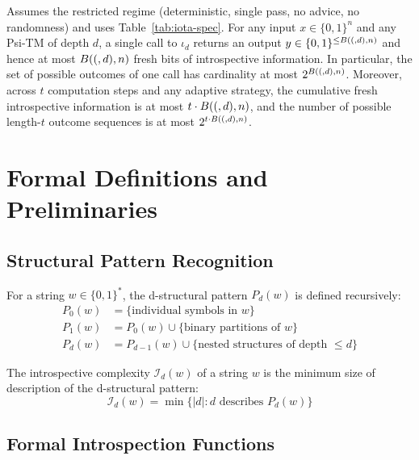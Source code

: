 
\begin{lemma}
\label{lem:one-step-budget-2}
Assumes the restricted regime (deterministic, single pass, no advice, no randomness) and uses Table~\ref{tab:iota-spec}.
For any input $x\in\{0,1\}^n$ and any Psi-TM of depth $d$, a single call to $\iota_d$ returns an output $y\in\{0,1\}^{\le B((,d),n)}$ and hence at most $B((,d),n)$ fresh bits of introspective information. In particular, the set of possible outcomes of one call has cardinality at most $2^{B((,d),n)}$. Moreover, across $t$ computation steps and any adaptive strategy, the cumulative fresh introspective information is at most $t \cdot B((,d),n)$, and the number of possible length-$t$ outcome sequences is at most $2^{t \cdot B((,d),n)}$.
\end{lemma}

\section{Formal Definitions and Preliminaries}

\subsection{Structural Pattern Recognition}

\begin{definition}
For a string $w \in \{0,1\}^*$, the d-structural pattern $P_d(w)$ is defined recursively:
\begin{align*}
P_0(w) &= \{\text{individual symbols in } w\} \\
P_1(w) &= P_0(w) \cup \{\text{binary partitions of } w\} \\
P_d(w) &= P_{d-1}(w) \cup \{\text{nested structures of depth } \leq d\}
\end{align*}
\end{definition}

\begin{definition}
The introspective complexity $\mathcal{I}_d(w)$ of a string $w$ is the minimum size of description of the d-structural pattern:
$$\mathcal{I}_d(w) = \min\{|d| : d \text{ describes } P_d(w)\}$$
\end{definition}

\subsection{Formal Introspection Functions}

